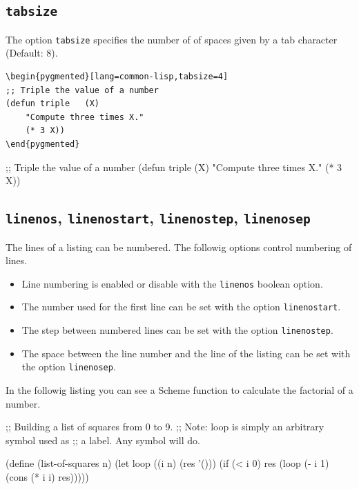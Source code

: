 \documentclass[10pt,a4paper]{article}
\begin{document}
\subsection{\texttt{tabsize}}

The option \verb|tabsize| specifies the number of of spaces given by a
tab character (Default: 8).

\begin{Verbatim}[showtabs,tabsize=1]
\begin{pygmented}[lang=common-lisp,tabsize=4]
;; Triple the value of a number
(defun triple	(X)
	"Compute three times X."
	(* 3 X))
\end{pygmented}
\end{Verbatim}

\begin{pygmented}[lang=common-lisp,tabsize=4]
;; Triple the value of a number
(defun triple	(X)
	"Compute three times X."
	(* 3 X))
\end{pygmented}


\subsection{\texttt{linenos}, \texttt{linenostart}, \texttt{linenostep}, \texttt{linenosep}}

The lines of a listing can be numbered. The followig options control
numbering of lines.
\begin{itemize}
  \item Line numbering is enabled or disable with the \verb|linenos|
  boolean option.
  \item The number used for the first line can be set with the option
  \verb|linenostart|.
  \item The step between numbered lines can be set with the option
  \verb|linenostep|.
  \item The space between the line number and the line of the listing
  can be set with the option \verb|linenosep|.
\end{itemize}

In the followig listing you can see a Scheme function to calculate the
factorial of a number.

\begin{Example}
\begin{pygmented}[lang=scheme,linenos,linenostart=1001,linenostep=2,linenosep=5mm]
;; Building a list of squares from 0 to 9.
;; Note: loop is simply an arbitrary symbol used as
;; a label. Any symbol will do.

(define (list-of-squares n)
  (let loop ((i n) (res '()))
    (if (< i 0)
        res
        (loop (- i 1) (cons (* i i) res)))))
\end{pygmented}
\end{Example}
\end{document}
